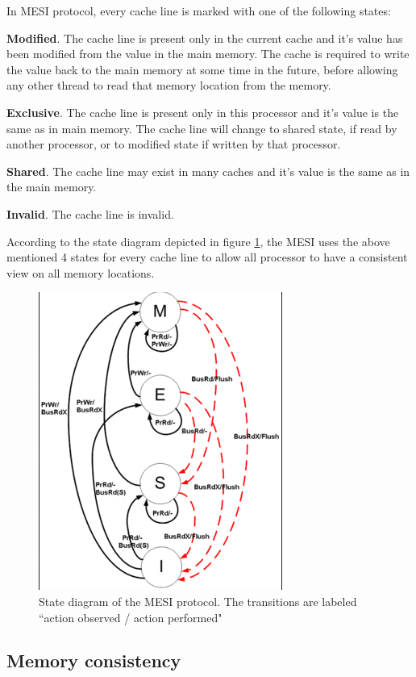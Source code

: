 In MESI protocol, every cache line is marked with one of the following states:

\textbf{Modified}. The cache line is present only in the current cache and it's value has been modified from the value in the main memory. The cache is required to write the value back to the main memory at some time in the future, before allowing any other thread to read that memory location from the memory.

\textbf{Exclusive}. The cache line is present only in this processor and it's value is the same as in main memory. The cache line will change to shared state, if read by another processor, or to modified state if written by that processor.

\textbf{Shared}. The cache line may exist in many caches and it's value is the same as in the main memory.

\textbf{Invalid}. The cache line is invalid.

According to the state diagram depicted in figure \ref{mesi_protocol}, the MESI uses the above mentioned 4 states for every cache line to allow all processor to have a consistent view on all memory locations.

\begin{figure} 
 \centering 
  \includegraphics[scale=0.7]{mesi_protocol.png} 
\caption{State diagram of the MESI protocol. The transitions are labeled “action observed / action performed"} 
\label{mesi_protocol} 
\end{figure} 

\subsection{Memory consistency}

